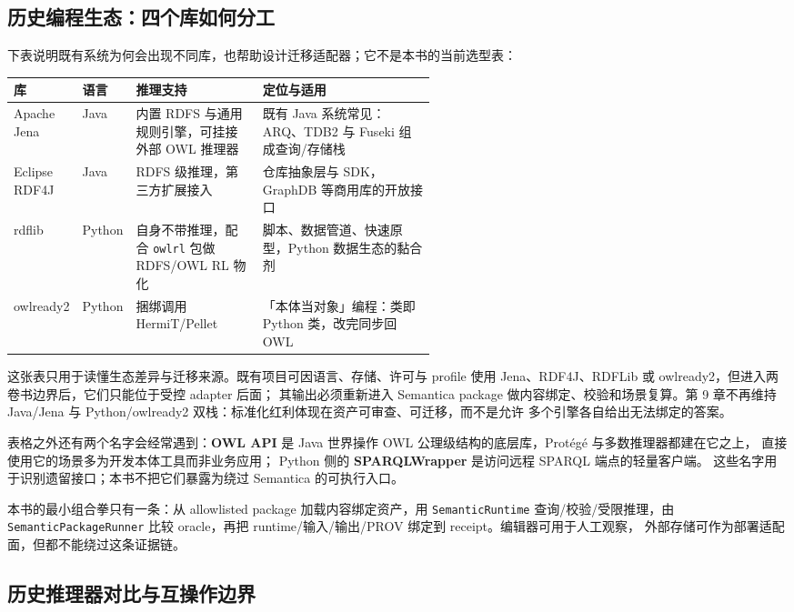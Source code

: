 \subsection{历史编程生态：四个库如何分工}

下表说明既有系统为何会出现不同库，也帮助设计迁移适配器；它不是本书的当前选型表：

\begin{center}
\small
\begin{tabularx}{\linewidth}{@{}p{0.15\linewidth}p{0.09\linewidth}p{0.30\linewidth}X@{}}
\toprule
\textbf{库} & \textbf{语言} & \textbf{推理支持} & \textbf{定位与适用} \\
\midrule
Apache Jena & Java & 内置 RDFS 与通用规则引擎，可挂接外部 OWL 推理器 & 既有 Java 系统常见：ARQ、TDB2 与 Fuseki 组成查询/存储栈 \\
Eclipse RDF4J & Java & RDFS 级推理，第三方扩展接入 & 仓库抽象层与 SDK，GraphDB 等商用库的开放接口 \\
rdflib & Python & 自身不带推理，配合 \texttt{owlrl} 包做 RDFS/OWL RL 物化 & 脚本、数据管道、快速原型，Python 数据生态的黏合剂 \\
owlready2 & Python & 捆绑调用 HermiT/Pellet & 「本体当对象」编程：类即 Python 类，改完同步回 OWL \\
\bottomrule
\end{tabularx}
\end{center}

这张表只用于读懂生态差异与迁移来源。既有项目可因语言、存储、许可与 profile 使用
Jena、RDF4J、RDFLib 或 owlready2，但进入两卷书边界后，它们只能位于受控 adapter 后面；
其输出必须重新进入 Semantica package 做内容绑定、校验和场景复算。第 9 章不再维持
Java/Jena 与 Python/owlready2 双栈：标准化红利体现在资产可审查、可迁移，而不是允许
多个引擎各自给出无法绑定的答案。

表格之外还有两个名字会经常遇到：\textbf{OWL API} 是 Java
世界操作 OWL 公理级结构的底层库，Protégé 与多数推理器都建在它之上，
直接使用它的场景多为开发本体工具而非业务应用；
Python 侧的 \textbf{SPARQLWrapper} 是访问远程 SPARQL 端点的轻量客户端。
这些名字用于识别遗留接口；本书不把它们暴露为绕过 Semantica 的可执行入口。

本书的最小组合拳只有一条：从 allowlisted package 加载内容绑定资产，用
\texttt{SemanticRuntime} 查询/校验/受限推理，由 \texttt{SemanticPackageRunner}
比较 oracle，再把 runtime/输入/输出/PROV 绑定到 receipt。编辑器可用于人工观察，
外部存储可作为部署适配面，但都不能绕过这条证据链。

\subsection{历史推理器对比与互操作边界}

